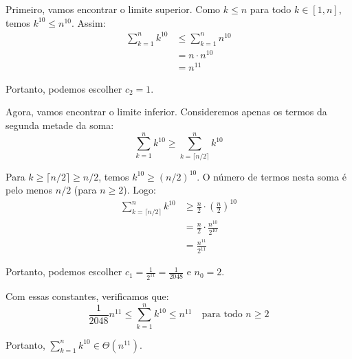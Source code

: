 \documentclass[a4paper,12pt]{article}
\begin{document}
Primeiro, vamos encontrar o limite superior. Como $k \leq n$ para todo $k \in [1, n]$, temos $k^{10} \leq n^{10}$. Assim:
\begin{align}
    \sum_{k=1}^{n} k^{10} &\leq \sum_{k=1}^{n} n^{10} \\
    &= n \cdot n^{10} \\
    &= n^{11}
\end{align}

Portanto, podemos escolher $c_2 = 1$.

Agora, vamos encontrar o limite inferior. Consideremos apenas os termos da segunda metade da soma:
\begin{equation}
    \sum_{k=1}^{n} k^{10} \geq \sum_{k=\lceil n/2 \rceil}^{n} k^{10}
\end{equation}

Para $k \geq \lceil n/2 \rceil \geq n/2$, temos $k^{10} \geq (n/2)^{10}$. O número de termos nesta soma é pelo menos $n/2$ (para $n \geq 2$). Logo:
\begin{align}
    \sum_{k=\lceil n/2 \rceil}^{n} k^{10} &\geq \frac{n}{2} \cdot \left(\frac{n}{2}\right)^{10} \\
    &= \frac{n}{2} \cdot \frac{n^{10}}{2^{10}} \\
    &= \frac{n^{11}}{2^{11}}
\end{align}

Portanto, podemos escolher $c_1 = \frac{1}{2^{11}} = \frac{1}{2048}$ e $n_0 = 2$.

Com essas constantes, verificamos que:
\begin{equation}
    \frac{1}{2048} n^{11} \leq \sum_{k=1}^{n} k^{10} \leq n^{11} \quad \text{para todo } n \geq 2
\end{equation}

Portanto, $\sum_{k=1}^{n} k^{10} \in \Theta(n^{11})$.
\end{document}
